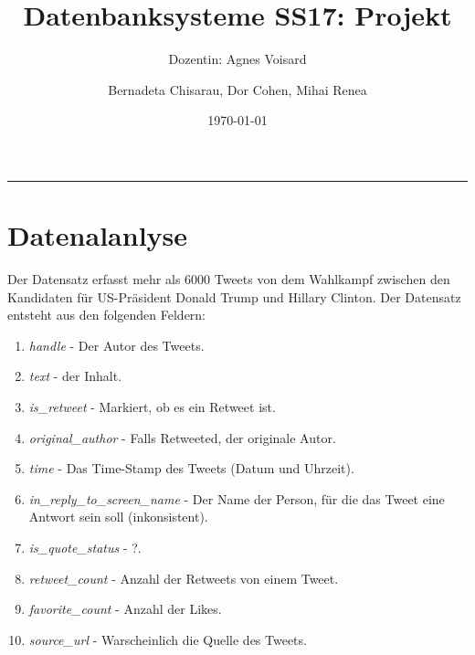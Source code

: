\documentclass[paper=a4, english, ngerman, romanian]{scrartcl}
\begin{document}
\begin{titlepage}
	\title{Datenbanksysteme SS17: Projekt}	
	\subtitle{Dozentin: Agnes Voisard}
	\author{Bernadeta Chisarau, Dor Cohen, Mihai Renea}
	\date{\normalsize \today}
\end{titlepage}

\maketitle								%
\vspace*{-8cm}							%

\vspace{7cm}							%
\rule{\linewidth}{0.8pt}				%

	\section{Datenalanlyse}
		Der Datensatz erfasst mehr als 6000 Tweets von dem Wahlkampf zwischen den Kandidaten für US-Präsident Donald Trump und Hillary Clinton. Der Datensatz entsteht aus den folgenden Feldern:
		\begin{enumerate}
		\item \textit{handle} - Der Autor des Tweets.
		\item \textit{text} - der Inhalt.
		\item \textit{is\_retweet} - Markiert, ob es ein Retweet ist.
		\item \textit{original\_author} - Falls Retweeted, der originale Autor.
		\item \textit{time} - Das Time-Stamp des Tweets (Datum und Uhrzeit).
		\item \textit{in\_reply\_to\_screen\_name} - Der Name der Person, für die das Tweet eine Antwort sein soll (inkonsistent).
		\item \textit{is\_quote\_status} - ?.
		\item \textit{retweet\_count} - Anzahl der Retweets von einem Tweet.
		\item \textit{favorite\_count} - Anzahl der Likes.
		\item \textit{source\_url} - Warscheinlich die Quelle des Tweets.
		\end{enumerate}
		
\end{document}
